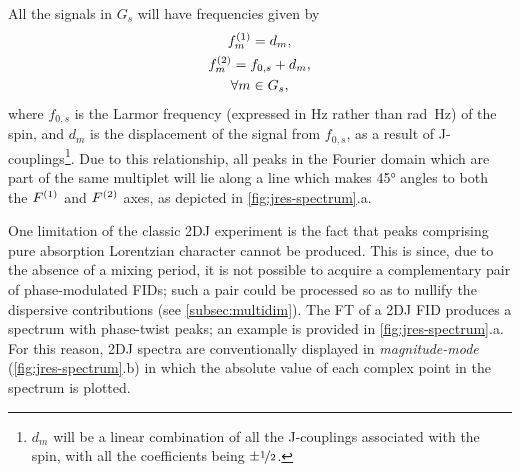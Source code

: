 All the signals in $G_s$ will have frequencies given by
\begin{subequations}
    \begin{gather}
        f_m^{(1)} = d_m,\\
        f_m^{(2)} = f_{0,s} + d_m,\\
        \forall m \in G_s\notag,
    \end{gather}%
    \label{eq:f1-f2-2dj}%
\end{subequations}
where $f_{0,s}$ is the Larmor frequency (expressed in \unit{\hertz} rather than
\unit{\radian \hertz}) of the spin, and $d_m$ is the displacement
of the signal from $f_{0,s}$, as a result of J-couplings\footnote{
    $d_m$ will be a linear combination of all the J-couplings
    associated with the spin, with all the coefficients being $\pm
    \nicefrac{1}{2}$.
}. Due to this relationship, all peaks in the Fourier domain which are part of
the same multiplet will lie along a line which makes \ang{45} angles to both
the $F^{(1)}$ and $F^{(2)}$ axes, as depicted in \cref{fig:jres-spectrum}.a.

One limitation of the classic \ac{2DJ} experiment is the fact that peaks comprising
pure absorption Lorentzian character cannot be produced. This is since, due
to the absence of a mixing period, it is not possible to acquire a
complementary pair of phase-modulated \acp{FID}; such a pair could be processed
so as to nullify the dispersive contributions (see \cref{subsec:multidim}).
The FT of a \ac{2DJ} \ac{FID} produces a spectrum with phase-twist
peaks; an example is provided in \cref{fig:jres-spectrum}.a. For this reason,
\ac{2DJ} spectra are conventionally displayed in \emph{magnitude-mode}
(\cref{fig:jres-spectrum}.b) in which the absolute value of each complex point
in the spectrum is plotted.

